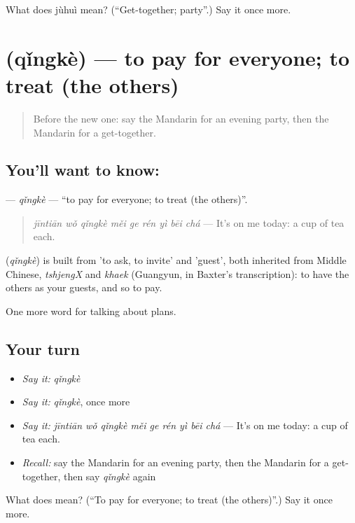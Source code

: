 \begin{tcolorbox}[breakable,colback=teal!4,colframe=teal!35!black,title={Before you move on}]
What does jùhuì mean? (\textquotedblleft{}Get-together; party\textquotedblright{}.) Say it once more.
\end{tcolorbox}
\section[\texorpdfstring{\zh{请客} (qǐngkè)}{请客 (qǐngkè)}]{ (qǐngkè) — to pay for everyone; to treat (the others)}

\label{lesson:ZH-C173-qingke}



\begin{quote}
Before the new one: say the Mandarin for an evening party, then the Mandarin for a get-together.
\end{quote}

\subsection*{You'll want to know: }
\textbf{} — \emph{qǐngkè} — \textquotedblleft{}to pay for everyone; to treat (the others)\textquotedblright{}.

\begin{quote}
\textbf{} \emph{jīntiān wǒ qǐngkè měi ge rén yì bēi chá} — It's on me today: a cup of tea each.
\end{quote}

\begin{cousinweb}
\textbf{} (\emph{qǐngkè}) is built from  'to ask, to invite' and  'guest', both inherited from Middle Chinese, \emph{tshjengX} and \emph{khaek} (Guangyun, in Baxter's transcription): to have the others as your guests, and so to pay.
\end{cousinweb}

\begin{grammarlens}[title={What you've built}]
One more word for talking about plans.
\end{grammarlens}

\subsection*{Your turn}
\begin{itemize}
\raggedright
  \item \emph{Say it:} \emph{qǐngkè}
  \item \emph{Say it:} \emph{qǐngkè}, once more
  \item \emph{Say it:} \emph{jīntiān wǒ qǐngkè měi ge rén yì bēi chá} — It's on me today: a cup of tea each.
  \item \emph{Recall:} say the Mandarin for an evening party, then the Mandarin for a get-together, then say \emph{qǐngkè} again
\end{itemize}

\begin{tcolorbox}[breakable,colback=teal!4,colframe=teal!35!black,title={Before you move on}]
What does  mean? (\textquotedblleft{}To pay for everyone; to treat (the others)\textquotedblright{}.) Say it once more.
\end{tcolorbox}
